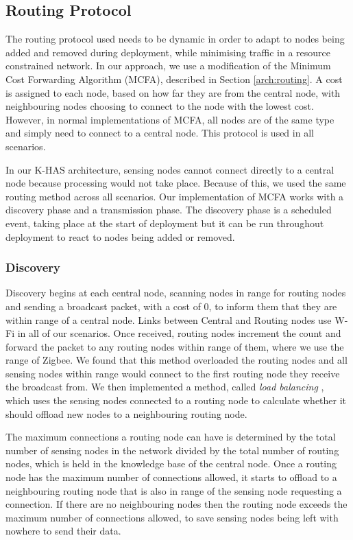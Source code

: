 \subsection{Routing Protocol}
The routing protocol used needs to be dynamic in order to adapt to nodes being added and removed during deployment, while minimising traffic in a resource constrained network. In our approach, we use a modification of the Minimum Cost Forwarding Algorithm (MCFA), described in Section \ref{arch:routing}. A cost is assigned to each node, based on how far they are from the central node, with neighbouring nodes choosing to connect to the node with the lowest cost. However, in normal implementations of MCFA, all nodes are of the same type and simply need to connect to a central node. This protocol is used in all scenarios.

In our K-HAS architecture, sensing nodes cannot connect directly to a central node because processing would not take place. Because of this, we used the same routing method across all scenarios. Our implementation of MCFA works with a discovery phase and a transmission phase. The discovery phase is a scheduled event, taking place at the start of deployment but it can be run throughout deployment to react to nodes being added or removed. 

\subsubsection{Discovery}\label{sim:disc}
	Discovery begins at each central node, scanning nodes in range for routing nodes and sending a broadcast packet, with a cost of 0, to inform them that they are within range of a central node. Links between Central and Routing nodes use W-Fi in all of our scenarios. Once received, routing nodes increment the count and forward the packet to any routing nodes within range of them, where we use the range of Zigbee. We found that this method overloaded the routing nodes and all sensing nodes within range would connect to the first routing node they receive the broadcast from. We then implemented a method, called \textit{load balancing} \cite{Gupta2003}, which uses the sensing nodes connected to a routing node to calculate whether it should offload new nodes to a neighbouring routing node.
	
	The maximum connections a routing node can have is determined by the total number of sensing nodes in the network divided by the total number of routing nodes, which is held in the knowledge base of the central node. Once a routing node has the maximum number of connections allowed, it starts to offload to a neighbouring routing node that is also in range of the sensing node requesting a connection. If there are no neighbouring nodes then the routing node exceeds the maximum number of connections allowed, to save sensing nodes being left with nowhere to send their data.
	
